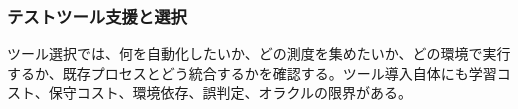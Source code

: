 \subsubsection{テストツール支援と選択}
ツール選択では、何を自動化したいか、どの測度を集めたいか、どの環境で実行するか、既存プロセスとどう統合するかを確認する。ツール導入自体にも学習コスト、保守コスト、環境依存、誤判定、オラクルの限界がある。
